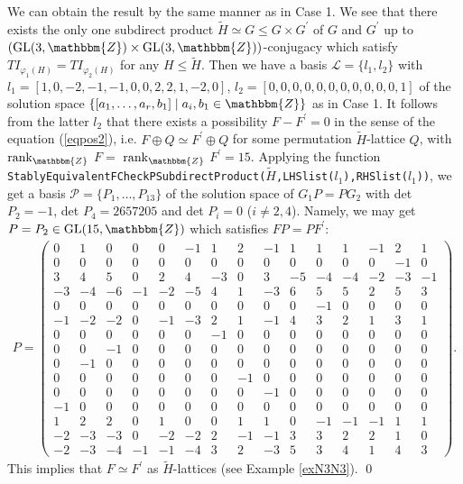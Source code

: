 \documentclass{amsart}
\theoremstyle{plain}
\theoremstyle{definition}
\theoremstyle{remark}
\newcommand{\bZ}{\mathbbm{Z}}\newcommand{\bQ}{\mathbbm{Q}}
\newcommand{\GL}{{\rm GL}}\newcommand{\SL}{{\rm SL}}
\newcounter{sub}\def\tr{\mbox{tr }}
\begin{document}
We can obtain the result by the same manner as in Case 1. 
We see that there exists the only one subdirect product 
$\widetilde{H}\simeq G\leq G\times G^\prime$ of $G$ and $G^\prime$ 
up to $(\GL(3,\bZ)\times \GL(3,\bZ))$-conjugacy 
which satisfy $TI_{\varphi_1(H)}=TI_{\varphi_2(H)}$ 
for any $H\leq \widetilde{H}$. 
Then we have a basis 
$\mathcal{L}=\{l_1,l_2\}$ with 
$l_1=[ 1, 0, -2, -1, -1, 0, 0, 2, 2, 1, -2, 0 ]$, 
$l_2=[ 0, 0, 0, 0, 0, 0, 0, 0, 0, 0, 0, 1 ]$ 
of the solution space 
$\{[a_1,\ldots,a_r,b_1]\mid a_i, b_1\in\bZ\}$ as in Case 1. 
It follows from the latter $l_2$ that there exists a possibility 
$F-F^\prime=0$ 
in the sense of the equation (\ref{eqpos2}), i.e. 
$F\oplus Q\simeq F^\prime\oplus Q$ for some permutation 
$\widetilde{H}$-lattice $Q$, 
with ${\rm rank}_{\bZ}$ $F=$ ${\rm rank}_{\bZ}$ $F^\prime=15$. 
Applying the function 
{\tt StablyEquivalentFCheckPSubdirectProduct($\widetilde{H}$,LHSlist($l_1$),RHSlist($l_1$))}, 
we get a basis $\mathcal{P}=\{P_1,\dots,P_{13}\}$ 
of the solution space of $G_1P=PG_2$ 
with det $P_2=-1$, det $P_4=2657205$ and det $P_i=0$ ($i\neq 2,4$). 
Namely, we may get $P=P_2\in \GL(15,\bZ)$ 
which satisfies $FP=PF^\prime$:
\begin{align*}
P=\left(\begin{array}{ccccccccccccccc} 
0&1&0&0&0&-1&1&2&-1&1&1&1&-1&2&1\\
0&0&0&0&0&0&0&0&0&0&0&0&0&-1&0\\
3&4&5&0&2&4&-3&0&3&-5&-4&-4&-2&-3&-1\\
-3&-4&-6&-1&-2&-5&4&1&-3&6&5&5&2&5&3\\
0&0&0&0&0&0&0&0&0&0&-1&0&0&0&0\\
-1&-2&-2&0&-1&-3&2&1&-1&4&3&2&1&3&1\\
0&0&0&0&0&0&-1&0&0&0&0&0&0&0&0\\
0&0&-1&0&0&0&0&0&0&0&0&0&0&0&0\\
0&-1&0&0&0&0&0&0&0&0&0&0&0&0&0\\
0&0&0&0&0&0&0&-1&0&0&0&0&0&0&0\\
0&0&0&0&0&0&0&0&-1&0&0&0&0&0&0\\
-1&0&0&0&0&0&0&0&0&0&0&0&0&0&0\\
1&2&2&0&1&0&0&1&1&0&-1&-1&-1&1&1\\
-2&-3&-3&0&-2&-2&2&-1&-1&3&3&2&2&1&0\\
-2&-3&-4&-1&-1&-4&3&2&-3&5&3&4&1&4&3
\end{array}\right). 
\end{align*}
This implies that $F\simeq F^\prime$ as $\widetilde{H}$-lattices 
(see Example \ref{exN3N3}).
\qed\\
\end{document}
